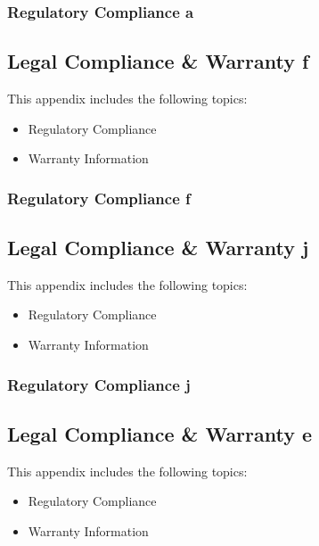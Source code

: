 \documentclass[letterpaper,10pt,openany,oneside,english]{sphinxmanual}
\begin{document}
\subsubsection{Regulatory Compliance a}
\label{\detokenize{why:regulatory-compliance-a}}

\subsection{Legal Compliance \& Warranty f}
\label{\detokenize{overview:legal-compliance-warranty-f}}\label{\detokenize{overview::doc}}
This appendix includes the following topics:
\begin{itemize}
\item {} 
Regulatory Compliance

\item {} 
Warranty Information

\end{itemize}


\subsubsection{Regulatory Compliance f}
\label{\detokenize{overview:regulatory-compliance-f}}

\subsection{Legal Compliance \& Warranty j}
\label{\detokenize{ecosystem:legal-compliance-warranty-j}}\label{\detokenize{ecosystem::doc}}
This appendix includes the following topics:
\begin{itemize}
\item {} 
Regulatory Compliance

\item {} 
Warranty Information

\end{itemize}


\subsubsection{Regulatory Compliance j}
\label{\detokenize{ecosystem:regulatory-compliance-j}}

\subsection{Legal Compliance \& Warranty e}
\label{\detokenize{partners:legal-compliance-warranty-e}}\label{\detokenize{partners::doc}}
This appendix includes the following topics:
\begin{itemize}
\item {} 
Regulatory Compliance

\item {} 
Warranty Information

\end{itemize}
\end{document}
